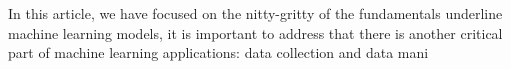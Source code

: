 In this article, we have focused on the nitty-gritty of the fundamentals underline machine learning models, it is important to address that there is another critical part of machine learning applications: data collection and data mani 